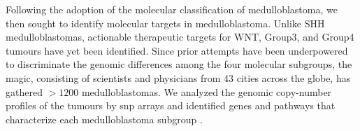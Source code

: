 Following the adoption of the molecular classification of medulloblastoma, we then sought to identify molecular targets in medulloblastoma. Unlike SHH medulloblastomas, actionable therapeutic targets for WNT, Group3, and Group4 tumours have yet been identified. Since prior attempts have been underpowered to discriminate the genomic differences among the four molecular subgroups, the \gls{magic}, consisting of scientists and physicians from 43 cities across the globe, has gathered $>1200$ medulloblastomas. We analyzed the genomic copy-number profiles of the tumours by \gls{snp} arrays and identified genes and pathways that characterize each medulloblastoma subgroup .

